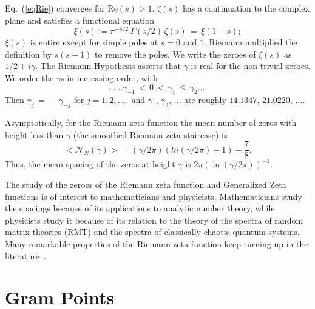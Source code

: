 \documentclass[twoside]{article}
\begin{document}
Eq.~(\ref{eqRie})  converges for $\mathrm{Re} (s) > 1$.  
 $\zeta ( s )$ has a  continuation
to the complex plane and satisfies a functional equation \cite{Riemann(1858),Riemann 1892, Titchmarsh 1986,Edwards(1974)}
\begin{equation}  
\xi(s):= \pi^{-s/2} \, \Gamma (s/2) \, \zeta ( s ) \, = \, \xi ( 1 - s );
\label{eq:func}
\end{equation}
$\xi(s)$ is entire except for simple poles at $s = 0$ and $1$. Riemann
multiplied the definition by $s(s-1)$ to remove the poles. We
write the zeroes of $\xi(s)$ as $1/2 + i \gamma$. The Riemann Hypothesis  
asserts that $\gamma$ is real for the non-trivial zeroes.
We order the $\gamma$s in increasing order, with 
\begin{equation}
\ldots \ldots \gamma_{-1} \, < \, 0 \, < \, 
\gamma_1 \, \leq \, \gamma_2 \ldots. 
\end{equation}
Then $\gamma_j \, = \, - \gamma_{-j}$ for $j = 1, 2, \ldots,$ 
and    $\gamma_1$, $\gamma_2$, $\ldots$  are roughly
$14.1347$, $21.0220$, $\ldots$.


Asymptotically, for the Riemann zeta function the mean number of 
zeros with height less than $\gamma$ (the smoothed Riemann zeta staircase)
is~\cite{Edwards(1974)}
\begin{equation}  
<\mathcal{N_R} (\gamma)> = (\gamma/2\pi)(ln(\gamma/2\pi)-1)-\frac{7}{8}.
\label{eq:Rnumber}
\end{equation}
Thus, the mean spacing of the zeros at height $\gamma$ is 
$2\pi(\ln (\gamma/2\pi))^{-1}$. 

The study of the zeroes of the Riemann zeta function and Generalized 
Zeta functions is of interest to mathematicians and physicists. Mathematicians 
study the spacings because of its applications to analytic number theory, 
while physicists study it because of its  relation 
to the theory of the spectra of random matrix theories (RMT) 
and the spectra of classically chaotic quantum systems. 
Many remarkable properties of the Riemann zeta function keep turning up in the literature~\cite{os6,Matiyasevich}.

\section{\label{sec3}Gram Points}
\end{document}
